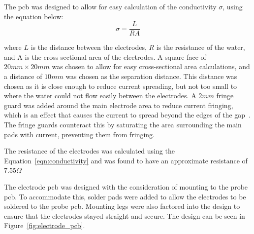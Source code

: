 The \gls{pcb} was designed to allow for easy calculation of the conductivity $\sigma$, using the equation below:
\begin{equation}\label{eqn:conductivity}
    \sigma = \frac{L}{RA}
\end{equation}

where $L$ is the distance between the electrodes, $R$ is the resistance of the water, and A is the cross-sectional area of the electrodes.
A square face of $20mm\times 20mm$ was chosen to allow for easy cross-sectional area calculations, and a distance of $10mm$ was chosen as the separation distance.
This distance was chosen as it is close enough to reduce current spreading, but not too small to where the water could not flow easily between the electrodes.
A $2mm$ fringe guard was added around the main electrode area to reduce current fringing, which is an effect that causes the current to spread beyond the edges of the gap~\cite{roshen_fringing}.
The fringe guards counteract this by saturating the area surrounding the main pads with current, preventing them from fringing.

The resistance of the electrodes was calculated using the Equation~\ref{eqn:conductivity} and was found to have an approximate resistance of $7.55\Omega$

The electrode \gls{pcb} was designed with the consideration of mounting to the probe \gls{pcb}.
To accommodate this, solder pads were added to allow the electrodes to be soldered to the probe \gls{pcb}.
Mounting legs were also factored into the design to ensure that the electrodes stayed straight and secure.
The design can be seen in Figure~\ref{fig:electrode_pcb}.


